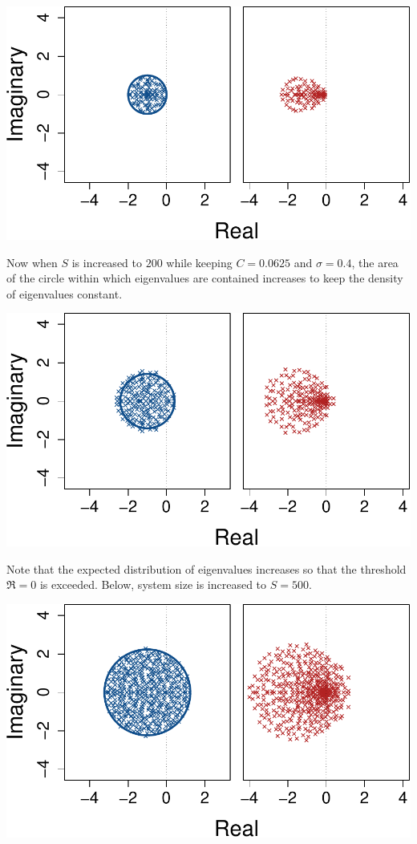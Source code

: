 \documentclass[]{article}
\begin{document}
\includegraphics{SI_files/figure-latex/unnamed-chunk-41-1.pdf}

Now when \(S\) is increased to \(200\) while keeping \(C = 0.0625\) and
\(\sigma = 0.4\), the area of the circle within which eigenvalues are
contained increases to keep the density of eigenvalues constant.

\includegraphics{SI_files/figure-latex/unnamed-chunk-42-1.pdf}

Note that the expected distribution of eigenvalues increases so that the
threshold \(\Re = 0\) is exceeded. Below, system size is increased to
\(S = 500\).

\includegraphics{SI_files/figure-latex/unnamed-chunk-43-1.pdf}
\end{document}
